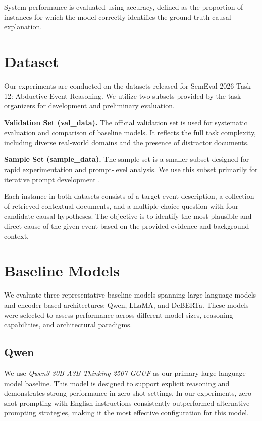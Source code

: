 \documentclass[11pt]{article}
\begin{document}
System performance is evaluated using accuracy, defined as the proportion of instances for which the model correctly identifies the ground-truth causal explanation.


\section{Dataset}

Our experiments are conducted on the datasets released for SemEval 2026 Task 12: Abductive Event Reasoning. We utilize two subsets provided by the task organizers for development and preliminary evaluation.

\textbf{Validation Set (val\_data).}  
The official validation set is used for systematic evaluation and comparison of baseline models. It reflects the full task complexity, including diverse real-world domains and the presence of distractor documents.

\textbf{Sample Set (sample\_data).}  
The sample set is a smaller subset designed for rapid experimentation and prompt-level analysis. We use this subset primarily for iterative prompt development .

Each instance in both datasets consists of a target event description, a collection of retrieved contextual documents, and a multiple-choice question with four candidate causal hypotheses. The objective is to identify the most plausible and direct cause of the given event based on the provided evidence and background context.

\section{Baseline Models}

We evaluate three representative baseline models spanning large language models and encoder-based architectures: Qwen, LLaMA, and DeBERTa. These models were selected to assess performance across different model sizes, reasoning capabilities, and architectural paradigms.

\subsection{Qwen}

We use \textit{Qwen3-30B-A3B-Thinking-2507-GGUF} as our primary large language model baseline. This model is designed to support explicit reasoning and demonstrates strong performance in zero-shot settings. In our experiments, zero-shot prompting with English instructions consistently outperformed alternative prompting strategies, making it the most effective configuration for this model.
\end{document}
